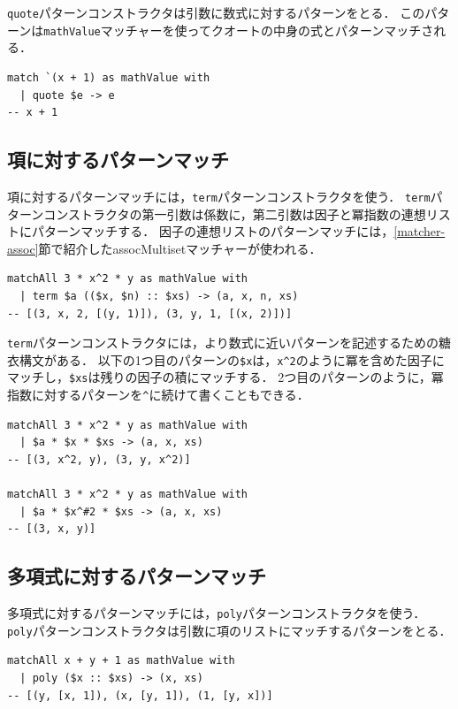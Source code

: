\lstinline{quote}パターンコンストラクタは引数に数式に対するパターンをとる．
このパターンは\lstinline{mathValue}マッチャーを使ってクオートの中身の式とパターンマッチされる．
\begin{lstlisting}[language=egison,numbers=none,escapechar=']
match `(x + 1) as mathValue with
  | quote $e -> e
-- x + 1
\end{lstlisting}


\subsection{項に対するパターンマッチ}

項に対するパターンマッチには，\lstinline{term}パターンコンストラクタを使う．
\lstinline{term}パターンコンストラクタの第一引数は係数に，第二引数は因子と冪指数の連想リストにパターンマッチする．
因子の連想リストのパターンマッチには，\ref{matcher-assoc}節で紹介したassocMultisetマッチャーが使われる．
\begin{lstlisting}[language=egison,numbers=none]
matchAll 3 * x^2 * y as mathValue with
  | term $a (($x, $n) :: $xs) -> (a, x, n, xs)
-- [(3, x, 2, [(y, 1)]), (3, y, 1, [(x, 2)])]
\end{lstlisting}

\lstinline{term}パターンコンストラクタには，より数式に近いパターンを記述するための糖衣構文がある．
以下の1つ目のパターンの\lstinline{$x}は，\lstinline{x^2}のように冪を含めた因子にマッチし，\lstinline{$xs}は残りの因子の積にマッチする．
2つ目のパターンのように，冪指数に対するパターンを\lstinline{^}に続けて書くこともできる．
\begin{lstlisting}[language=egison,numbers=none]
matchAll 3 * x^2 * y as mathValue with
  | $a * $x * $xs -> (a, x, xs)
-- [(3, x^2, y), (3, y, x^2)]

matchAll 3 * x^2 * y as mathValue with
  | $a * $x^#2 * $xs -> (a, x, xs)
-- [(3, x, y)]
\end{lstlisting}

\subsection{多項式に対するパターンマッチ}

多項式に対するパターンマッチには，\lstinline{poly}パターンコンストラクタを使う．
\lstinline{poly}パターンコンストラクタは引数に項のリストにマッチするパターンをとる．
\begin{lstlisting}[language=egison,numbers=none]
matchAll x + y + 1 as mathValue with
  | poly ($x :: $xs) -> (x, xs)
-- [(y, [x, 1]), (x, [y, 1]), (1, [y, x])]
\end{lstlisting}

